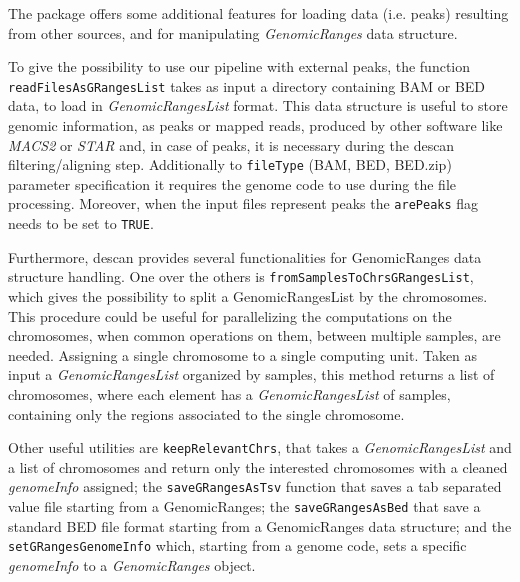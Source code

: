 The package offers some additional features for loading data (i.e. peaks) resulting from other sources, and for manipulating \textit{GenomicRanges} data structure.

To give the possibility to use our pipeline with external peaks, the function \lstinline!readFilesAsGRangesList! takes as input a directory containing BAM or BED data, to load in \textit{GenomicRangesList} format.
This data structure is useful to store genomic information, as peaks or mapped reads, produced by other software like \textit{MACS2} or \textit{STAR} and, in case of peaks, it is necessary during the \gls{descan} filtering/aligning step.
Additionally to \lstinline!fileType! (BAM, BED, BED.zip) parameter specification it requires the genome code to use during the file processing.
Moreover, when the input files represent peaks the \lstinline!arePeaks! flag needs to be set to \lstinline!TRUE!.

Furthermore, \gls{descan} provides several functionalities for GenomicRanges data structure
handling. One over the others is \lstinline!fromSamplesToChrsGRangesList!, which gives the possibility to split a GenomicRangesList by the chromosomes. 
This procedure could be useful for parallelizing the computations on the chromosomes, when common operations on them, between multiple samples, are needed. Assigning a single chromosome to a single computing unit.
Taken as input a \textit{GenomicRangesList} organized by samples, this method returns a list of chromosomes, where each element has a \textit{GenomicRangesList} of samples, containing only the regions associated to the single chromosome.


Other useful utilities are \lstinline!keepRelevantChrs!, that takes a \textit{GenomicRangesList} and a list of chromosomes and return only the interested chromosomes with a cleaned \textit{genomeInfo} assigned;
the \lstinline!saveGRangesAsTsv! function that saves a tab separated value file starting from a GenomicRanges; the 
\lstinline!saveGRangesAsBed! that save a standard BED file format starting from a GenomicRanges data structure; and the \lstinline!setGRangesGenomeInfo! which, starting from a genome code, sets a specific \textit{genomeInfo} to a \textit{GenomicRanges} object.